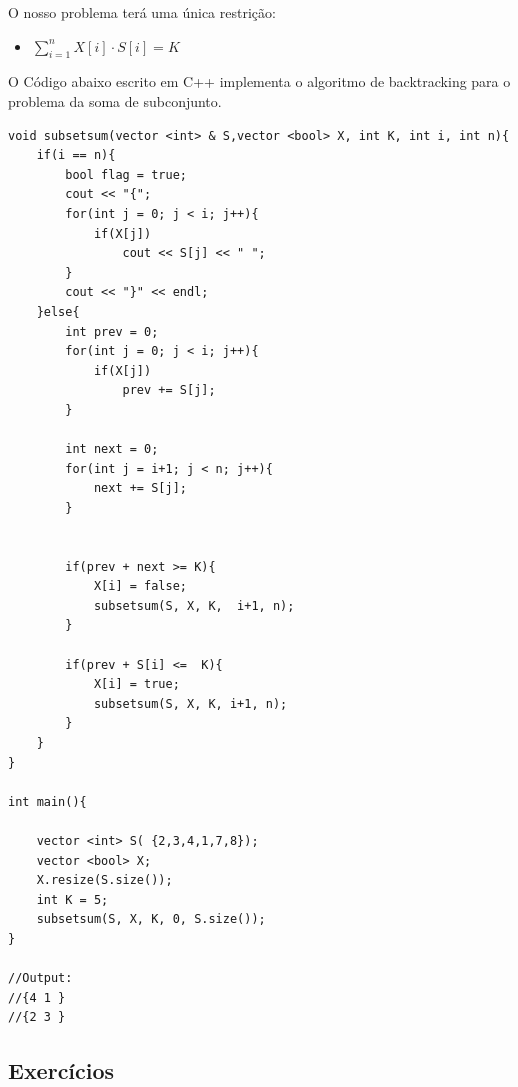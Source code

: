 O nosso problema terá uma única restrição:

\begin{itemize}
    \item $\sum_{i=1}^{n} X[i]\cdot S[i] = K$
\end{itemize}

O Código abaixo escrito em C++ implementa o algoritmo de backtracking para o problema da soma de subconjunto.

\newpage 

\begin{verbatim}
void subsetsum(vector <int> & S,vector <bool> X, int K, int i, int n){
    if(i == n){
        bool flag = true;
        cout << "{";
        for(int j = 0; j < i; j++){
            if(X[j])
                cout << S[j] << " ";
        }
        cout << "}" << endl;
    }else{
        int prev = 0;
        for(int j = 0; j < i; j++){
            if(X[j])
                prev += S[j];
        }
        
        int next = 0;
        for(int j = i+1; j < n; j++){
            next += S[j];
        }

        
        if(prev + next >= K){            
            X[i] = false;
            subsetsum(S, X, K,  i+1, n);
        }
        
        if(prev + S[i] <=  K){
            X[i] = true;
            subsetsum(S, X, K, i+1, n);
        }
    }
}

int main(){
    
    vector <int> S( {2,3,4,1,7,8});
    vector <bool> X;
    X.resize(S.size());
    int K = 5;
    subsetsum(S, X, K, 0, S.size());
}

//Output:
//{4 1 }
//{2 3 }

\end{verbatim}

\subsection{Exercícios}

